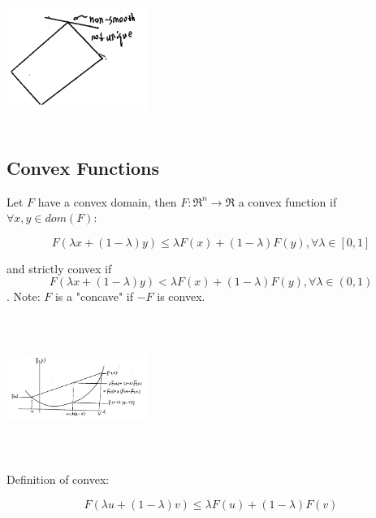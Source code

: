 \begin{enumerate}
	\begin{marginfigure}
	\centering
	\includegraphics[width=1.8in,height=1.8in]{figures/ch08/figure1030_5.png}
	\end{marginfigure}
\end{enumerate}

\subsection{Convex Functions}
Let $F$ have a convex domain, then $F:\Re^n\rightarrow \Re$ a convex function if $\forall x,y \in dom(F)$:

\begin{equation*}
F(\lambda x + (1-\lambda)y) \leq \lambda F(x) + (1-\lambda)F(y), \forall \lambda \in [0,1]
\end{equation*}

and strictly convex if 
\begin{equation*}
F(\lambda x + (1-\lambda)y) < \lambda F(x) + (1-\lambda)F(y), \forall \lambda \in (0,1)
\end{equation*}
.
Note: $F$ is a "concave" if $-F$ is convex.

\begin{marginfigure}
	\centering
	\includegraphics[width=1.8in,height=1.8in]{figures/ch08/figure1030_6.png}
\end{marginfigure}

Definition of convex:

\begin{equation*}
F(\lambda u + (1-\lambda)v) \leq \lambda F(u) + (1-\lambda)F(v)
\end{equation*}

